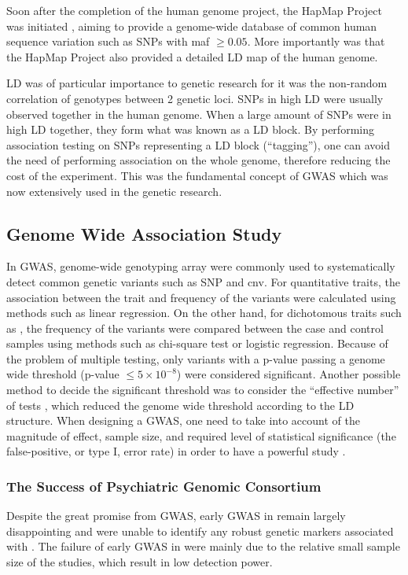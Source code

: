 	Soon after the completion of the human genome project, the HapMap Project was initiated \citep{Consortium2005}, aiming to provide a genome-wide database of common human sequence variation such as \glspl{SNP} with \gls{maf} $\ge0.05$.
	More importantly was that the HapMap Project also provided a detailed \gls{LD} map of the human genome.
	
	\gls{LD} was of particular importance to genetic research for it was the non-random correlation of genotypes between 2 genetic loci. 
	\glspl{SNP} in high \gls{LD} were usually observed together in the human genome.
	When a large amount of \glspl{SNP} were in high \gls{LD} together, they form what was known as a \gls{LD} block.
	By performing association testing on \glspl{SNP} representing a \gls{LD} block (``tagging''), one can avoid the need of performing association on the whole genome, therefore reducing the cost of the experiment.
	This was the fundamental concept of \gls{GWAS} which was now extensively used in the genetic research.
	
	\subsection{Genome Wide Association Study}
	In \gls{GWAS}, genome-wide genotyping array were commonly used to systematically detect common genetic variants such as \gls{SNP} and \gls{cnv}.
	For quantitative traits, the association between the trait and frequency of the variants were calculated using methods such as linear regression.
	On the other hand, for dichotomous traits such as , the frequency of the variants were compared between the case and control samples using methods such as chi-square test or logistic regression.
	Because of the problem of multiple testing, only variants with a p-value passing a genome wide threshold (p-value $\le5\times10^{-8}$) were considered significant.
	Another possible method to decide the significant threshold was to consider the ``effective number'' of tests \citep{Li2011}, which reduced the genome wide threshold according to the \gls{LD} structure.
	When designing a \gls{GWAS}, one need to take into account of the magnitude of effect, sample size, and required level of statistical significance (the false-positive, or type I, error rate) in order to have a powerful study \citep{Purcell2003}.
	
	\subsubsection{The Success of Psychiatric Genomic Consortium} 
	Despite the great promise from \gls{GWAS}, early \gls{GWAS} in  remain largely disappointing and were unable to identify any robust genetic markers associated with .
	The failure of early \gls{GWAS} in  were mainly due to the relative small sample size of the studies, which result in low detection power.
	
